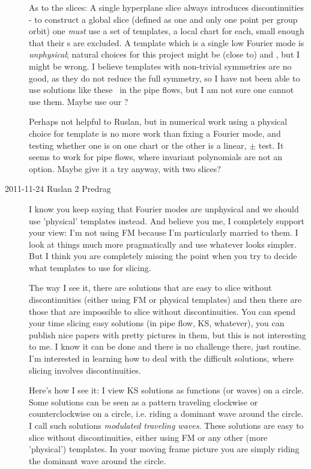 \begin{description}
As to the slices: A single hyperplane slice always
introduces discontinuities - to construct a global slice (defined as one
and only one point per group orbit) one \emph{must} use a set of
templates, a local chart for each, small enough that their \sset s are
excluded. A template which is a single low Fourier mode is
\emph{unphysical}; natural choices for this project might be (close to)
 and , but I might be wrong. I believe templates with
non-trivial symmetries are no good, as they do not reduce the full
symmetry, so I have not been able to use solutions like these \eqva\ in
the pipe flows, but I am not sure one cannot use them. Maybe use our
?

Perhaps not helpful to Ruslan, but in numerical work using a physical
choice for template is no more work than fixing a Fourier mode, and
testing whether one is on one chart or the other is a linear, $\pm$ test.
It seems to work for pipe flows, where invariant polynomials are not an
option. Maybe give it a try anyway, with two slices?

\item[2011-11-24 Ruslan 2 Predrag] I know you keep saying that Fourier modes are unphysical and we should use 'physical' templates instead.  And believe you me, I completely support your view: I'm not using FM because I'm particularly married to them.  I look at things much more pragmatically and use whatever looks simpler.  But I think you are completely missing the point when you try to decide what templates to use for slicing.  
    
    The way I see it, there are solutions that are easy to slice without discontinuities (either using FM or physical templates) and then there are those that are impossible to slice without discontinuities.  You can spend your time slicing easy solutions (in pipe flow, KS, whatever), you can publish nice papers with pretty pictures in them, but this is not interesting to me.  I know it can be done and there is no challenge there, just routine.  I'm interested in learning how to deal with the difficult solutions, where slicing involves discontinuities.
    
    Here's how I see it: I view KS solutions as functions (or waves) on a circle.  Some solutions can be seen as a pattern traveling clockwise or counterclockwise on a circle, i.e. riding a dominant wave around the circle.  I call such solutions {\em modulated traveling waves}.  These solutions are easy to slice without discontinuities, either using FM or any other (more 'physical') templates.  In your moving frame picture you are simply riding the dominant wave around the circle.  
    

\end{description}
